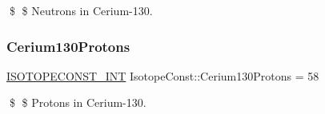 \$ \$ Neutrons in Cerium-\/130. \mbox{\label{group___isotope_const-_cerium-_ce130_gaf069d3b92900ba4d801c5cabf58e1295}} 
\subsubsection{\texorpdfstring{Cerium130\+Protons}{Cerium130Protons}}
{\footnotesize\ttfamily \mbox{\hyperlink{group___isotope_const-_macros_ga5f18360b3e99483a35c32d789e62621c}{I\+S\+O\+T\+O\+P\+E\+C\+O\+N\+S\+T\+\_\+\+I\+NT}} Isotope\+Const\+::\+Cerium130\+Protons = 58}

\$ \$ Protons in Cerium-\/130. 